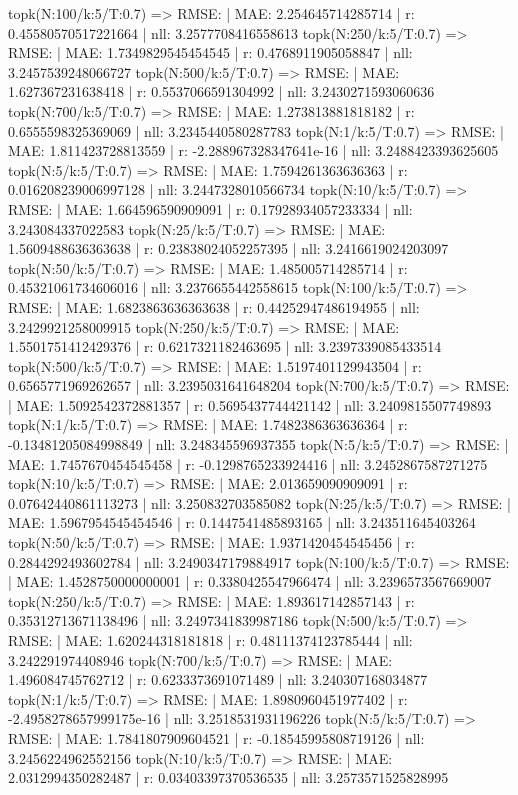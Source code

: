 topk(N:100/k:5/T:0.7) => RMSE: | MAE: 2.254645714285714 | r: 0.45580570517221664 | nll: 3.2577708416558613
topk(N:250/k:5/T:0.7) => RMSE: | MAE: 1.7349829545454545 | r: 0.4768911905058847 | nll: 3.2457539248066727
topk(N:500/k:5/T:0.7) => RMSE: | MAE: 1.627367231638418 | r: 0.5537066591304992 | nll: 3.2430271593060636
topk(N:700/k:5/T:0.7) => RMSE: | MAE: 1.273813881818182 | r: 0.6555598325369069 | nll: 3.2345440580287783
topk(N:1/k:5/T:0.7) => RMSE: | MAE: 1.811423728813559 | r: -2.288967328347641e-16 | nll: 3.2488423393625605
topk(N:5/k:5/T:0.7) => RMSE: | MAE: 1.7594261363636363 | r: 0.016208239006997128 | nll: 3.2447328010566734
topk(N:10/k:5/T:0.7) => RMSE: | MAE: 1.664596590909091 | r: 0.17928934057233334 | nll: 3.243084337022583
topk(N:25/k:5/T:0.7) => RMSE: | MAE: 1.5609488636363638 | r: 0.23838024052257395 | nll: 3.2416619024203097
topk(N:50/k:5/T:0.7) => RMSE: | MAE: 1.485005714285714 | r: 0.45321061734606016 | nll: 3.2376655442558615
topk(N:100/k:5/T:0.7) => RMSE: | MAE: 1.6823863636363638 | r: 0.44252947486194955 | nll: 3.2429921258009915
topk(N:250/k:5/T:0.7) => RMSE: | MAE: 1.5501751412429376 | r: 0.6217321182463695 | nll: 3.2397339085433514
topk(N:500/k:5/T:0.7) => RMSE: | MAE: 1.5197401129943504 | r: 0.6565771969262657 | nll: 3.2395031641648204
topk(N:700/k:5/T:0.7) => RMSE: | MAE: 1.5092542372881357 | r: 0.5695437744421142 | nll: 3.2409815507749893
topk(N:1/k:5/T:0.7) => RMSE: | MAE: 1.7482386363636364 | r: -0.13481205084998849 | nll: 3.248345596937355
topk(N:5/k:5/T:0.7) => RMSE: | MAE: 1.7457670454545458 | r: -0.1298765233924416 | nll: 3.2452867587271275
topk(N:10/k:5/T:0.7) => RMSE: | MAE: 2.013659090909091 | r: 0.07642440861113273 | nll: 3.250832703585082
topk(N:25/k:5/T:0.7) => RMSE: | MAE: 1.5967954545454546 | r: 0.1447541485893165 | nll: 3.243511645403264
topk(N:50/k:5/T:0.7) => RMSE: | MAE: 1.9371420454545456 | r: 0.2844292493602784 | nll: 3.2490347179884917
topk(N:100/k:5/T:0.7) => RMSE: | MAE: 1.4528750000000001 | r: 0.3380425547966474 | nll: 3.2396573567669007
topk(N:250/k:5/T:0.7) => RMSE: | MAE: 1.893617142857143 | r: 0.35312713671138496 | nll: 3.2497341839987186
topk(N:500/k:5/T:0.7) => RMSE: | MAE: 1.620244318181818 | r: 0.48111374123785444 | nll: 3.242291974408946
topk(N:700/k:5/T:0.7) => RMSE: | MAE: 1.496084745762712 | r: 0.6233373691071489 | nll: 3.240307168034877
topk(N:1/k:5/T:0.7) => RMSE: | MAE: 1.8980960451977402 | r: -2.4958278657999175e-16 | nll: 3.2518531931196226
topk(N:5/k:5/T:0.7) => RMSE: | MAE: 1.7841807909604521 | r: -0.18545995808719126 | nll: 3.2456224962552156
topk(N:10/k:5/T:0.7) => RMSE: | MAE: 2.0312994350282487 | r: 0.03403397370536535 | nll: 3.2573571525828995
